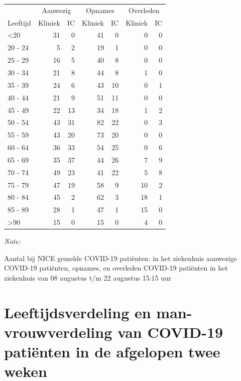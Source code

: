 \documentclass[
  english,
  man,floatsintext]{apa6}
\begin{document}
\begin{table}
\centering\begingroup\fontsize{10}{12}\selectfont

\begin{threeparttable}
\begin{tabular}{lrrrrrr}
\toprule
\multicolumn{1}{c}{ } & \multicolumn{2}{c}{Aanwezig} & \multicolumn{2}{c}{Opnames} & \multicolumn{2}{c}{Overleden} \\
\cmidrule(l{3pt}r{3pt}){2-3} \cmidrule(l{3pt}r{3pt}){4-5} \cmidrule(l{3pt}r{3pt}){6-7}
Leeftijd & Kliniek & IC & Kliniek & IC & Kliniek & IC\\
\midrule
<20 & 31 & 0 & 41 & 0 & 0 & 0\\
20 - 24 & 5 & 2 & 19 & 1 & 0 & 0\\
25 - 29 & 16 & 5 & 40 & 8 & 0 & 0\\
30 - 34 & 21 & 8 & 44 & 8 & 1 & 0\\
35 - 39 & 24 & 6 & 43 & 10 & 0 & 1\\
40 - 44 & 21 & 9 & 51 & 11 & 0 & 0\\
45 - 49 & 22 & 13 & 34 & 18 & 1 & 2\\
50 - 54 & 43 & 31 & 82 & 22 & 0 & 3\\
55 - 59 & 43 & 20 & 73 & 20 & 0 & 0\\
60 - 64 & 36 & 33 & 54 & 25 & 0 & 6\\
65 - 69 & 35 & 37 & 44 & 26 & 7 & 9\\
70 - 74 & 49 & 23 & 41 & 22 & 5 & 8\\
75 - 79 & 47 & 19 & 58 & 9 & 10 & 2\\
80 - 84 & 45 & 2 & 62 & 3 & 18 & 1\\
85 - 89 & 28 & 1 & 47 & 1 & 15 & 0\\
>90 & 15 & 0 & 15 & 0 & 4 & 0\\
\bottomrule
\end{tabular}
\begin{tablenotes}
\item \textit{Note: } 
\item Aantal bij NICE gemelde COVID-19 patiënten: in het ziekenhuis aanwezige COVID-19 patiënten, opnames, en overleden COVID-19 patiënten in het ziekenhuis van 08 augustus t/m 22 augustus 15:15 uur
\end{tablenotes}
\end{threeparttable}
\endgroup{}
\end{table}

\newpage

\hypertarget{leeftijdsverdeling-en-man-vrouwverdeling-van-covid-19-patiuxebnten-in-de-afgelopen-twee-weken}{%
\section{Leeftijdsverdeling en man-vrouwverdeling van COVID-19 patiënten in de afgelopen twee weken}\label{leeftijdsverdeling-en-man-vrouwverdeling-van-covid-19-patiuxebnten-in-de-afgelopen-twee-weken}}
\end{document}

